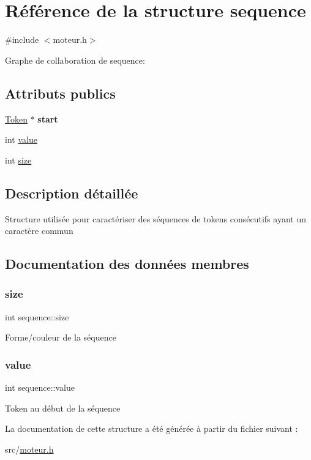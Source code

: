 \hypertarget{structsequence}{}\section{Référence de la structure sequence}
\label{structsequence}


{\ttfamily \#include $<$moteur.\+h$>$}



Graphe de collaboration de sequence\+:
\subsection*{Attributs publics}
\begin{DoxyCompactItemize}
\item 
\mbox{\label{structsequence_adf532045ce43a4ac8dea13803b7d6c54}} 
\hyperlink{threetogo_8h_aa045e14e6c37e43b762ccba9c3ed6d9e}{Token} $\ast$ {\bfseries start}
\item 
int \hyperlink{structsequence_afc6c5739bdd4f04665e45f1ab5b6c936}{value}
\item 
int \hyperlink{structsequence_a2e3a55bdcde2a669b6267502d4ec0ef5}{size}
\end{DoxyCompactItemize}


\subsection{Description détaillée}
Structure utilisée pour caractériser des séquences de tokens consécutifs ayant un caractère commun 

\subsection{Documentation des données membres}
\mbox{\label{structsequence_a2e3a55bdcde2a669b6267502d4ec0ef5}} 
\subsubsection{\texorpdfstring{size}{size}}
{\footnotesize\ttfamily int sequence\+::size}

Forme/couleur de la séquence \mbox{\label{structsequence_afc6c5739bdd4f04665e45f1ab5b6c936}} 
\subsubsection{\texorpdfstring{value}{value}}
{\footnotesize\ttfamily int sequence\+::value}

Token au début de la séquence 

La documentation de cette structure a été générée à partir du fichier suivant \+:\begin{DoxyCompactItemize}
\item 
src/\hyperlink{moteur_8h}{moteur.\+h}\end{DoxyCompactItemize}
